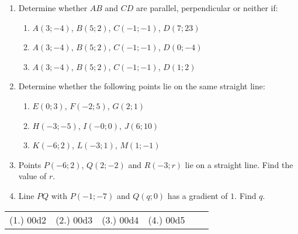\begin{exercises}{}{
\begin{enumerate}[itemsep=5pt, label=\textbf{\arabic*}. ]
\item Determine whether $AB$ and $CD$ are parallel, perpendicular or neither if:
  \begin{enumerate}[noitemsep, label=\textbf{(\alph*)} ]
  \item $A(3;-4)$, $B(5;2)$, $C(-1;-1)$, $D(7;23)$
  \item $A(3;-4)$, $B(5;2)$, $C(-1;-1)$, $D(0;-4)$
  \item $A(3;-4)$, $B(5;2)$, $C(-1;-1)$, $D(1;2)$
  \end{enumerate}
\item Determine whether the following points lie on the same straight line:
  \begin{enumerate}[noitemsep, label=\textbf{(\alph*)} ]
  \item $E(0;3)$, $F(-2;5)$, $G(2;1)$
  \item $H(-3;-5)$, $I(-0;0)$, $J(6;10)$
  \item $K(-6;2)$, $L(-3;1)$, $M(1;-1)$
  \end{enumerate}
\item Points $P(-6;2)$, $Q(2;-2)$ and $R(-3;r)$ lie on a straight line. Find the value of $r$.
\item Line $PQ$ with $P(-1;-7)$ and $Q(q;0)$ has a gradient of $1$. Find $q$.
\end{enumerate}
\practiceinfo
\par 
\par \begin{tabular}[h]{cccccc}
(1.) 00d2&  (2.) 00d3&  (3.) 00d4&  (4.) 00d5\end{tabular}
}
\end{exercises}
\par
%     
%     
%     

